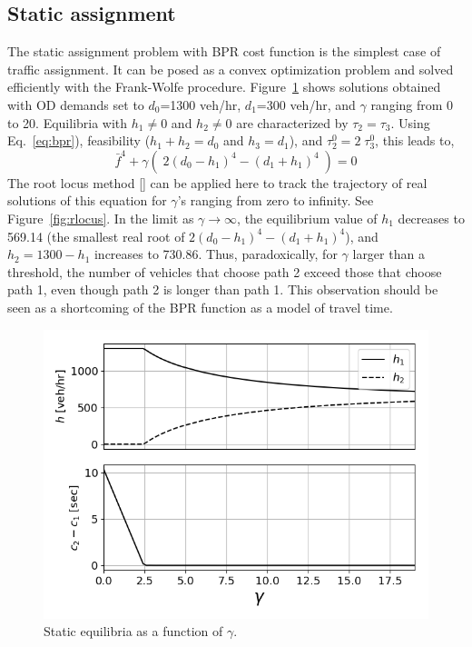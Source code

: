\subsection{Static assignment}
The static assignment problem with BPR cost function is the simplest case of traffic assignment. It can be posed as a convex optimization problem and solved efficiently with the Frank-Wolfe procedure. Figure~\ref{fig:static} shows solutions obtained with OD demands set to $d_0$=1300 veh/hr, $d_1$=300 veh/hr, and $\gamma$ ranging from 0 to 20. Equilibria with $h_1\neq 0$ and $h_2\neq 0$ are characterized by $\tau_2=\tau_3$. Using Eq.~\ref{eq:bpr}), feasibility ($h_1+h_2=d_0$ and $h_3=d_1$), and $\tau^0_2=2\;\tau^0_3$, this leads to,
\begin{equation}
\bar{f}^4 + \gamma\left(\;2(d_0-h_1)^4 - (d_1+h_1)^4 \;\right) = 0
\end{equation}
The root locus method [\XXX] can be applied here to track the trajectory of real solutions of this equation for $\gamma$'s ranging from zero to infinity. See Figure~\ref{fig:rlocus}. In the limit as $\gamma\rightarrow\infty$, the equilibrium value of $h_1$ decreases to 569.14 (the smallest real root of $2(d_0-h_1)^4 - (d_1+h_1)^4$), and $h_2=1300-h_1$ increases to 730.86. Thus, paradoxically, for $\gamma$ larger than a threshold, the number of vehicles that choose path 2 exceed those that choose path 1, even though path 2 is longer than path 1. This observation should be seen as a shortcoming of the BPR function as a model of travel time.

\begin{figure}[h]
    \centering
    \includegraphics[width=0.8\linewidth]{figs/static.png}
    \caption{Static equilibria as a function of $\gamma$.}
    \label{fig:static}
\end{figure}


